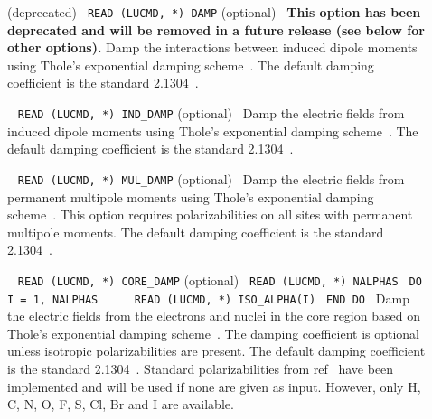 \begin{description}
\item[] (deprecated)\verb| |\newline
\verb|READ (LUCMD, *) DAMP| (optional)\verb| |\newline
\textbf{This option has been deprecated and will be removed in a future release (see below for other options).} Damp the interactions between induced dipole moments using Thole's exponential damping scheme~\cite{thole_damp_1,thole_damp_2}. The default damping coefficient is the standard 2.1304~\cite{thole_damp_2}.

\item[]\verb| |\newline
\verb|READ (LUCMD, *) IND_DAMP| (optional)\verb| |\newline
Damp the electric fields from induced dipole moments using Thole's exponential damping scheme~\cite{thole_damp_1,thole_damp_2}. The default damping coefficient is the standard 2.1304~\cite{thole_damp_2}.

\item[]\verb| |\newline
\verb|READ (LUCMD, *) MUL_DAMP| (optional)\verb| |\newline
Damp the electric fields from permanent multipole moments using Thole's exponential damping scheme~\cite{thole_damp_1,thole_damp_2}. This option requires polarizabilities on all sites with permanent multipole moments. The default damping coefficient is the standard 2.1304~\cite{thole_damp_2}.

\item[]\verb| |\newline
\verb|READ (LUCMD, *) CORE_DAMP| (optional)\verb| |\newline
\verb|READ (LUCMD, *) NALPHAS|\verb| |\newline
\verb|DO I = 1, NALPHAS|\verb| |\newline
\verb|    READ (LUCMD, *) ISO_ALPHA(I)|\verb| |\newline
\verb|END DO|\verb| |\newline
Damp the electric fields from the electrons and nuclei in the core region based on Thole's exponential damping scheme~\cite{thole_damp_1,thole_damp_2}. The damping coefficient is optional unless isotropic polarizabilities are present. The default damping coefficient is the standard 2.1304~\cite{thole_damp_2}. Standard polarizabilities from ref~ have been implemented and will be used if none are given as input. However, only H, C, N, O, F, S, Cl, Br and I are available.


\end{description}
